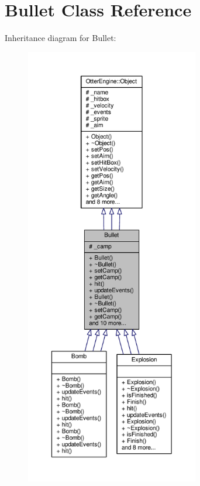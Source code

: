 \hypertarget{class_bullet}{}\section{Bullet Class Reference}
\label{class_bullet}


Inheritance diagram for Bullet\+:\nopagebreak
\begin{figure}[H]
\begin{center}
\leavevmode
\includegraphics[height=550pt]{dc/dae/class_bullet__inherit__graph}
\end{center}
\end{figure}


